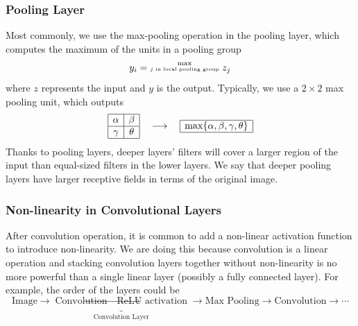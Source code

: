 \documentclass[11pt]{article}
\begin{document}
\subsubsection{Pooling Layer}
Most commonly, we use the max-pooling operation in the pooling layer, which computes the maximum of the units in a pooling group
\begin{equation}
    y_i = \overset{\LARGE{\max}}{\tiny{\text{$j$ in local pooling group}}}~z_j
\end{equation}
where $z$ represents the input and $y$ is the output. Typically, we use a $2\times 2$ max pooling unit, which outputs
\begin{equation}
    \begin{array}{|c|c|}
        \hline
        \alpha & \beta \\
        \hline
        \gamma & \theta \\
        \hline
    \end{array} 
    \quad \longrightarrow
    \quad
    \begin{array}{|c|}
        \hline
            \max\{\alpha, \beta, \gamma, \theta\} \\
        \hline
    \end{array}
\end{equation}
Thanks to pooling layers, deeper layers' filters will cover a larger region of the input than equal-sized filters in the lower layers. We say that deeper pooling layers have larger receptive fields in terms of the original image. 

\subsubsection{Non-linearity in Convolutional Layers}
After convolution operation, it is common to add a non-linear activation function to introduce non-linearity. We are doing this because convolution is a linear operation and stacking convolution layers together without non-linearity is no more powerful than a single linear layer (possibly a fully connected layer). For example, the order of the layers could be
\begin{equation}
    \text{Image} \rightarrow \underbrace{\text{Convolution} \rightarrow \text{ReLU activation}}_{\text{Convolution Layer}} \rightarrow \text{Max Pooling} \rightarrow \text{Convolution} \rightarrow \cdots
\end{equation}
\end{document}
